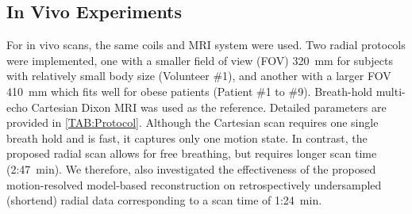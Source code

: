 \documentclass[journal,twoside,web]{ieeecolor}
\begin{document}
\subsection{In Vivo Experiments}

For in vivo scans, the same coils and MRI system were used. 
Two radial protocols were implemented, one with a smaller field of view (FOV) 
\SI{320}{\milli\meter} for subjects with relatively small body size (Volunteer \#1), 
and another with a larger FOV \SI{410}{\milli\meter} 
which fits well for obese patients (Patient \#1 to \#9). %
Breath-hold multi-echo Cartesian Dixon MRI was used as the reference. 
Detailed parameters are provided in \cref{TAB:Protocol}. 
Although the Cartesian scan requires one single breath hold 
and is fast, it captures only one motion state. 
In contrast, the proposed radial scan allows for free breathing, 
but requires longer scan time (2:47~\si{\minute}). 
We therefore, also investigated the effectiveness of 
the proposed motion-resolved model-based reconstruction 
on retrospectively undersampled (shortend)
radial data corresponding to a scan time of 1:24~\si{\minute}.
\end{document}
